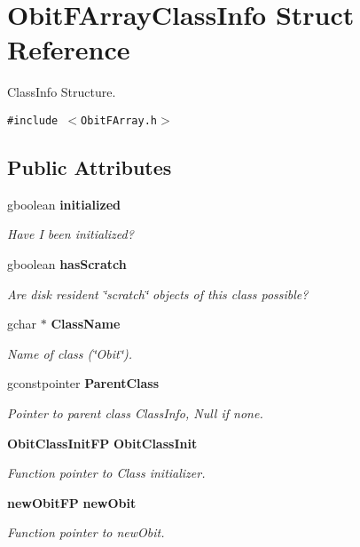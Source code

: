 \section{Obit\-FArray\-Class\-Info Struct Reference}
\label{structObitFArrayClassInfo}
Class\-Info Structure.  


{\tt \#include $<$Obit\-FArray.h$>$}

\subsection*{Public Attributes}
\begin{CompactItemize}
\item 
gboolean {\bf initialized}
\begin{CompactList}\small\item\em Have I been initialized? \item\end{CompactList}\item 
gboolean {\bf has\-Scratch}
\begin{CompactList}\small\item\em Are disk resident \char`\"{}scratch\char`\"{} objects of this class possible? \item\end{CompactList}\item 
gchar $\ast$ {\bf Class\-Name}
\begin{CompactList}\small\item\em Name of class (\char`\"{}Obit\char`\"{}). \item\end{CompactList}\item 
gconstpointer {\bf Parent\-Class}
\begin{CompactList}\small\item\em Pointer to parent class Class\-Info, Null if none. \item\end{CompactList}\item 
{\bf Obit\-Class\-Init\-FP} {\bf Obit\-Class\-Init}
\begin{CompactList}\small\item\em Function pointer to Class initializer. \item\end{CompactList}\item 
{\bf new\-Obit\-FP} {\bf new\-Obit}
\begin{CompactList}\small\item\em Function pointer to new\-Obit. \item\end{CompactList}\item 

\end{CompactItemize}
